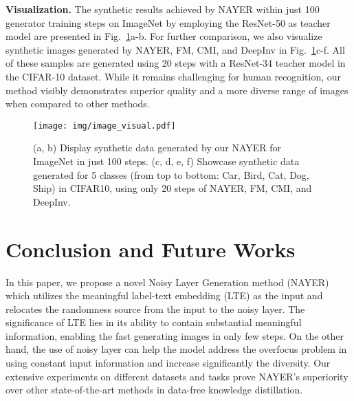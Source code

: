 \documentclass{article} %
\begin{document}
\noindent
\textbf{Visualization.} The synthetic results achieved by NAYER within just 100 generator training steps on ImageNet by employing the ResNet-50 as teacher model are presented in Fig.~\ref{fig:visual}a-b. For further comparison, we also visualize synthetic images generated by NAYER, FM, CMI, and DeepInv in Fig.~\ref{fig:visual}c-f. All of these samples are generated using 20 steps with a ResNet-34 teacher model in the CIFAR-10 dataset. While it remains challenging for human recognition, our method visibly demonstrates superior quality and a more diverse range of images when compared to other methods.

\begin{figure}[t]
\begin{center}
\texttt{[image: img/image\_visual.pdf]}
\end{center}
\caption{(a, b) Display synthetic data generated by our NAYER for ImageNet in just 100 steps. (c, d, e, f) Showcase synthetic data generated for 5 classes (from top to bottom: Car, Bird, Cat, Dog, Ship) in CIFAR10, using only 20 steps of NAYER, FM, CMI, and DeepInv.}
\label{fig:visual}
\end{figure}

\section{Conclusion and Future Works}

In this paper, we propose a novel Noisy Layer Generation method (NAYER) which utilizes the meaningful label-text embedding (LTE) as the input and relocates the randomness source from the input to the noisy layer. The significance of LTE lies in its ability to contain substantial meaningful information, enabling the fast generating images in only few steps. On the other hand, the use of noisy layer can help the model address the overfocus problem in using constant input information and increase significantly the diversity. Our extensive experiments on different datasets and tasks prove NAYER's superiority over other state-of-the-art methods in data-free knowledge distillation. 
\end{document}
